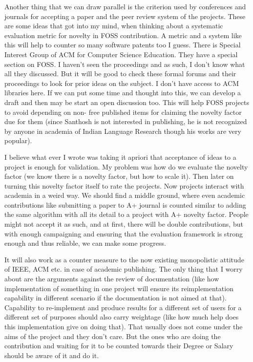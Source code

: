 Another thing that we can draw parallel is the criterion used
by conferences and journals for accepting a paper and the peer review system
of the projects. These are some ideas that got into my mind, when thinking about a
systematic evaluation metric for novelty in FOSS contribution. A metric
and a system like this will help to counter so many software patents too I guess.
There is Special Interest Group of ACM for Computer Science Education.
They have a special section on FOSS. I haven't seen the proceedings and as such, I
don't know what all they discussed. But it will be good to check these
formal forums and their proceedings to look for prior ideas on the subject.
I don't have access to ACM libraries here. If we can put some time and
thought into this, we can develop a draft and then may be start an open
discussion too. This will help FOSS projects to avoid depending on non-
free published items for claiming the novelty factor due for them (since
Santhosh is not interested in publishing, he is not recognized by anyone
in academia of Indian Language Research though his works are very popular).


I believe what ever I wrote was taking it apriori that acceptance of ideas
to a project is enough for validation. My problem was how do we evaluate
the novelty factor (we know there is a novelty factor, but how to scale it).
Then later on turning this novelty factor itself to rate the projects.
Now projects interact with academia in a weird way. We should find a middle
ground, where even academic contributions like submitting a paper to A+
journal is counted similar to adding the same algorithm with all its detail
to a project with A+ novelty factor. People might not accept it as such,
and at first, there will be double contributions, but with enough campaigning
and ensuring that the evaluation framework is strong enough and thus reliable,
we can make some progress.

It will also work as a counter measure to the now existing
monopolistic attitude of IEEE, ACM etc. in case of academic publishing. The
only thing that I worry about are the arguments against the review of documentation 
(like how implementation of something in one project will ensure its
reimplementation capability in different scenario if the documentation
is not aimed at that). Capability to re-implement and produce results for
a different set of users for a different set of purposes should also carry
weightage (like how much help does this implementation give on doing that).
That usually does not come under the aims of the project and they don't care.
But the ones who are doing the contribution and waiting for it to be counted
towards their Degree or Salary should be aware of it and do it.

